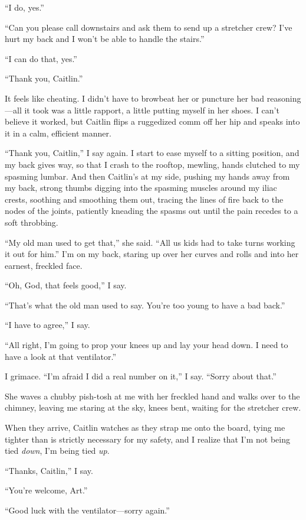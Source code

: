 “I do, yes.”

“Can you please call downstairs and ask them to send up a stretcher
crew? I’ve hurt my back and I won’t be able to handle the stairs.”

“I can do that, yes.”

“Thank you, Caitlin.”

It feels like cheating. I didn’t have to browbeat her or puncture
her bad reasoning—all it took was a little rapport, a little
putting myself in her shoes. I can’t believe it worked, but Caitlin
flips a ruggedized comm off her hip and speaks into it in a calm,
efficient manner.

“Thank you, Caitlin,” I say again. I start to ease myself to a
sitting position, and my back gives way, so that I crash to the
rooftop, mewling, hands clutched to my spasming lumbar. And then
Caitlin’s at my side, pushing my hands away from my back, strong
thumbs digging into the spasming muscles around my iliac crests,
soothing and smoothing them out, tracing the lines of fire back to
the nodes of the joints, patiently kneading the spasms out until
the pain recedes to a soft throbbing.

“My old man used to get that,” she said. “All us kids had to take
turns working it out for him.” I’m on my back, staring up over her
curves and rolls and into her earnest, freckled face.

“Oh, God, that feels good,” I say.

“That’s what the old man used to say. You’re too young to have a
bad back.”

“I have to agree,” I say.

“All right, I’m going to prop your knees up and lay your head down.
I need to have a look at that ventilator.”

I grimace. “I’m afraid I did a real number on it,” I say. “Sorry
about that.”

She waves a chubby pish-tosh at me with her freckled hand and walks
over to the chimney, leaving me staring at the sky, knees bent,
waiting for the stretcher crew.

When they arrive, Caitlin watches as they strap me onto the board,
tying me tighter than is strictly necessary for my safety, and I
realize that I’m not being tied \emph{down}, I’m being tied
\emph{up}.

“Thanks, Caitlin,” I say.

“You’re welcome, Art.”

“Good luck with the ventilator—sorry again.”

